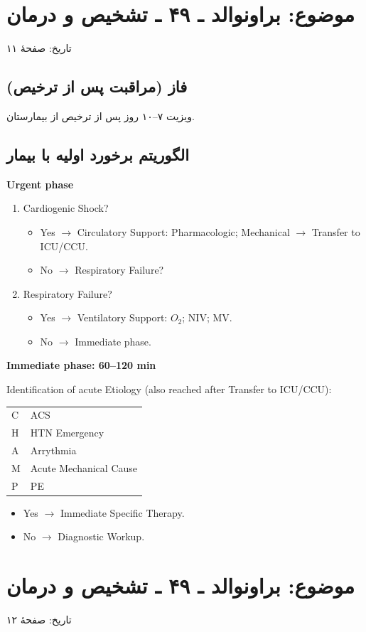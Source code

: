 \documentclass[12pt,a4paper]{article}
\providecommand{\en}[1]{\lr{#1}}
\newcommand{\AHFpage}[1]{\clearpage\section*{موضوع: براونوالد ـ ۴۹ ـ تشخیص و درمان \en{AHF}}{\footnotesize تاریخ: \en{/ /}\quad صفحهٔ #1\par}}
\begin{document}
\AHFpage{۱۱}
\subsection*{فاز \en{IV} (مراقبت پس از ترخیص)}
ویزیت ۷–۱۰ روز پس از ترخیص از بیمارستان.
\subsection*{الگوریتم برخورد اولیه با بیمار \en{AHF}}
\begin{latin}
\textbf{Urgent phase}
\begin{enumerate}
\item Cardiogenic Shock?
  \begin{itemize}
  \item Yes $\longrightarrow$ Circulatory Support: Pharmacologic; Mechanical $\longrightarrow$ Transfer to ICU/CCU.
  \item No $\longrightarrow$ Respiratory Failure?
  \end{itemize}
\item Respiratory Failure?
  \begin{itemize}
  \item Yes $\longrightarrow$ Ventilatory Support: $O_2$; NIV; MV.
  \item No $\longrightarrow$ Immediate phase.
  \end{itemize}
\end{enumerate}
\textbf{Immediate phase: 60--120 min}
\par Identification of acute Etiology (also reached after Transfer to ICU/CCU):
\begin{center}
\begin{tabular}{ll}
C & ACS \\
H & HTN Emergency \\
A & Arrythmia \\
M & Acute Mechanical Cause \\
P & PE \\
\end{tabular}
\end{center}
\begin{itemize}
\item Yes $\longrightarrow$ Immediate Specific Therapy.
\item No $\longrightarrow$ Diagnostic Workup.
\end{itemize}
\end{latin}

\AHFpage{۱۲}
\end{document}
